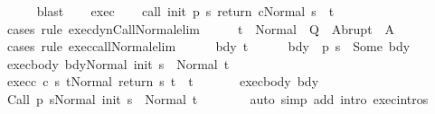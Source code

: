 \begin{isabellebody}
\ \ \ \ \isamarkupfalse%
\ blast\isanewline
\ \ \isamarkupfalse%
\ exec\isanewline
\ \ \isamarkupfalse%
\ {\isachardoublequoteopen}{\isasymGamma}{\isasymturnstile}{\isasymlangle}call\ init\ {\isacharparenleft}p\ s{\isacharparenright}\ return\ c{\isacharcomma}Normal\ s{\isasymrangle}\ {\isasymRightarrow}\ t{\isachardoublequoteclose}\isanewline
\ \ \ \ \isamarkupfalse%
\ {\isacharparenleft}cases\ rule{\isacharcolon}\ exec{\isacharunderscore}dynCall{\isacharunderscore}Normal{\isacharunderscore}elim{\isacharparenright}\isanewline
\ \ \isamarkupfalse%
\ \isamarkupfalse%
\ {\isachardoublequoteopen}t\ {\isasymin}\ Normal\ {\isacharbackquote}\ Q\ {\isasymunion}\ Abrupt\ {\isacharbackquote}\ A{\isachardoublequoteclose}\isanewline
\ \ \isamarkupfalse%
\ {\isacharparenleft}cases\ rule{\isacharcolon}\ exec{\isacharunderscore}call{\isacharunderscore}Normal{\isacharunderscore}elim{\isacharparenright}\isanewline
\ \ \ \ \isamarkupfalse%
\ bdy\ t{\isacharprime}\isanewline
\ \ \ \ \isamarkupfalse%
\ bdy{\isacharcolon}\ {\isachardoublequoteopen}{\isasymGamma}\ {\isacharparenleft}p\ s{\isacharparenright}\ {\isacharequal}\ Some\ bdy{\isachardoublequoteclose}\isanewline
\ \ \ \ \isamarkupfalse%
\ exec{\isacharunderscore}body{\isacharcolon}\ {\isachardoublequoteopen}{\isasymGamma}{\isasymturnstile}{\isasymlangle}bdy{\isacharcomma}Normal\ {\isacharparenleft}init\ s{\isacharparenright}{\isasymrangle}\ {\isasymRightarrow}\ Normal\ t{\isacharprime}{\isachardoublequoteclose}\ \isanewline
\ \ \ \ \isamarkupfalse%
\ exec{\isacharunderscore}c{\isacharcolon}\ {\isachardoublequoteopen}{\isasymGamma}{\isasymturnstile}{\isasymlangle}c\ s\ t{\isacharprime}{\isacharcomma}Normal\ {\isacharparenleft}return\ s\ t{\isacharprime}{\isacharparenright}{\isasymrangle}\ {\isasymRightarrow}\ t{\isachardoublequoteclose}\ \isanewline
\ \ \ \ \isamarkupfalse%
\ exec{\isacharunderscore}body\ bdy\isanewline
\ \ \ \ \isamarkupfalse%
\ {\isachardoublequoteopen}{\isasymGamma}{\isasymturnstile}{\isasymlangle}Call\ {\isacharparenleft}p\ s{\isacharparenright}{\isacharcomma}Normal\ {\isacharparenleft}init\ s{\isacharparenright}{\isasymrangle}\ {\isasymRightarrow}\ Normal\ t{\isacharprime}{\isachardoublequoteclose}\isanewline
\ \ \ \ \ \ \isamarkupfalse%
\ {\isacharparenleft}auto\ simp\ add{\isacharcolon}\ intro{\isacharcolon}\ exec{\isachardot}intros{\isacharparenright}\isanewline

\end{isabellebody}
